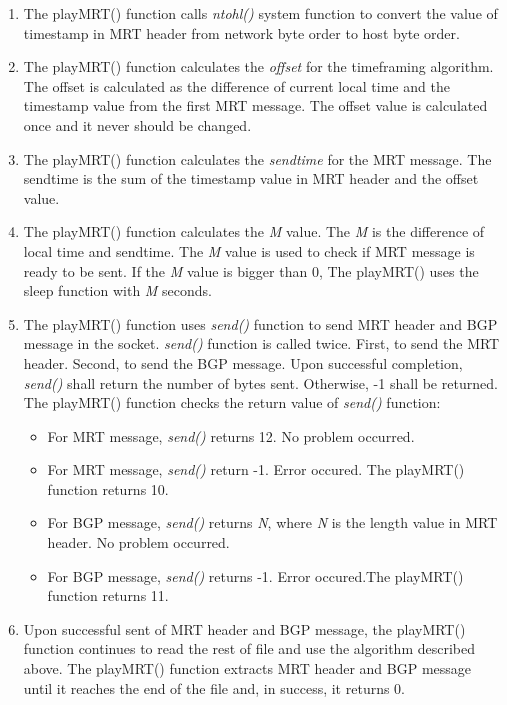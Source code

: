 \begin{enumerate}
\begin{enumerate}
  \item{The  playMRT() function  calls \emph{ntohl()} system function to convert the value of timestamp in MRT header from network byte order to host byte order. }
  \item{The  playMRT() function calculates the \emph{offset} for the timeframing algorithm. The offset is calculated as the difference of current local time and the timestamp value from  the first MRT message.  The offset value is calculated once and it never should be changed.}
  \item{The  playMRT() function calculates the \emph{sendtime} for the MRT message. The sendtime is the sum of the timestamp value in MRT header and the offset value. }\
  \item{The  playMRT() function calculates the \emph{M} value. The \emph{M} is the difference of local time and sendtime. The \emph{M} value is used to check if MRT message is ready to be sent. If the \emph{M} value is bigger than 0,  The  playMRT() uses the sleep function with \emph{M} seconds.}
  \item{The  playMRT() function uses \emph{send()} function to send  MRT header and BGP message in the socket. \emph{send()} function is called twice.  First, to send the MRT header. Second, to send the BGP message.  Upon successful completion, \emph{send()} shall return the number of bytes sent. Otherwise, -1 shall be returned. The  playMRT() function checks the return value  of \emph{send()} function:}
   \begin{itemize}
  \item{For MRT message, \emph{send()} returns 12.    No problem occurred. }
  \item{For MRT message, \emph{send()} return -1. Error occured. The  playMRT() function returns 10.}
  \item{For BGP message, \emph{send()} returns \emph{N}, where \emph{N} is the length value in MRT header. No problem occurred.}
  \item{For BGP message, \emph{send()} returns -1. Error occured.The  playMRT() function returns 11. }
  \end{itemize}
  
  \item{Upon successful sent of MRT header and BGP message, the  playMRT() function continues to read the rest of file and use the algorithm described above. The  playMRT() function extracts MRT header and BGP message until it reaches the end of the file and, in success,  it returns 0.}


\end{enumerate}
\end{enumerate}
